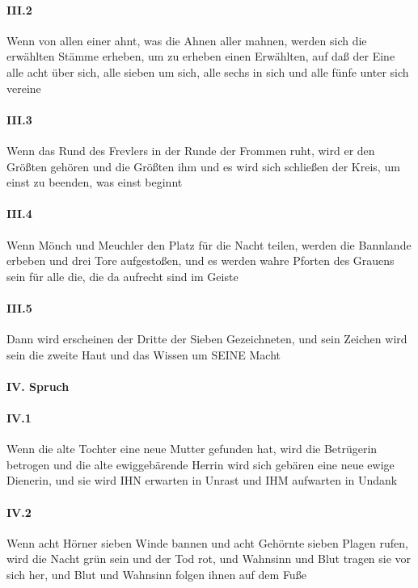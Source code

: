 \paragraph{III.2} Wenn von allen einer ahnt, was die Ahnen aller mahnen, werden sich die erwählten Stämme erheben, um zu erheben einen Erwählten, auf daß der Eine alle acht über sich, alle sieben um sich, alle sechs in sich und alle fünfe unter sich vereine

\paragraph{III.3} Wenn das Rund des Frevlers in der Runde der Frommen ruht, wird er den Größten gehören und die Größten ihm und es wird sich schließen der Kreis, um einst zu beenden, was einst beginnt

\paragraph{III.4} Wenn Mönch und Meuchler den Platz für die Nacht teilen, werden die Bannlande erbeben und drei Tore aufgestoßen, und es werden wahre Pforten des Grauens sein für alle die, die da aufrecht sind im Geiste

\paragraph{III.5} Dann wird erscheinen der Dritte der Sieben Gezeichneten, und sein Zeichen wird sein die zweite Haut und das Wissen um SEINE Macht

\paragraph{IV. Spruch}

\paragraph{IV.1} Wenn die alte Tochter eine neue Mutter gefunden hat, wird die Betrügerin betrogen und die alte ewiggebärende Herrin wird sich gebären eine neue ewige Dienerin, und sie wird IHN erwarten in Unrast und IHM aufwarten in Undank

\paragraph{IV.2} Wenn acht Hörner sieben Winde bannen und acht Gehörnte sieben Plagen rufen, wird die Nacht grün sein und der Tod rot, und Wahnsinn und Blut tragen sie vor sich her, und Blut und Wahnsinn folgen ihnen auf dem Fuße

